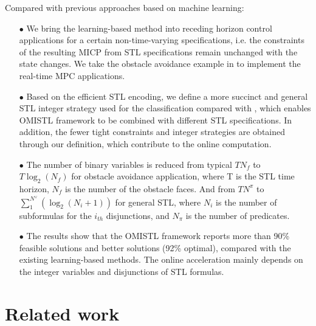 \documentclass[a4paper]{report}
\begin{document}
Compared with previous approaches based on machine learning:

\begin{itemize} 
    \item[$\bullet$]
    We bring the learning-based method into receding horizon control applications for a certain non-time-varying specifications, i.e. the constraints of the resulting MICP from STL specifications remain unchanged with the state changes. We take the obstacle avoidance example in \cite{bertsimas2022online} to implement the real-time MPC applications.
\end{itemize}

\begin{itemize} 
    \item[$\bullet$]Based on the efficient STL encoding, we define a more succinct and general STL integer strategy used for the classification compared with \cite{bertsimas2022online}\cite{Cauligi2020}, which enables OMISTL framework to be combined with different STL specifications. In addition, the fewer tight constraints and integer strategies are obtained through our definition, which contribute to the online computation.
\end{itemize}

\begin{itemize}
    \item[$\bullet$]The number of binary variables is reduced from typical $TN_f$ to $T\log_2(N_f)$ for obstacle avoidance application, where T is the STL time horizon, $N_f$ is the number of the obstacle faces. And from $TN^\pi$ to $\sum_{1}^{N^\lor}(\log_2(N_i+1))$ for general STL, where $N_i$ is the number of subformulas for the $i_{th}$ disjunctions, and $N_{\pi}$ is the number of predicates.
\end{itemize}

\begin{itemize} 
    \item[$\bullet$] The results show that the OMISTL framework reports more than 90\% feasible solutions and better solutions (92\% optimal), compared with the existing learning-based methods. The online acceleration mainly depends on the integer variables and disjunctions of STL formulas.
\end{itemize}

\section{Related work}
\end{document}
